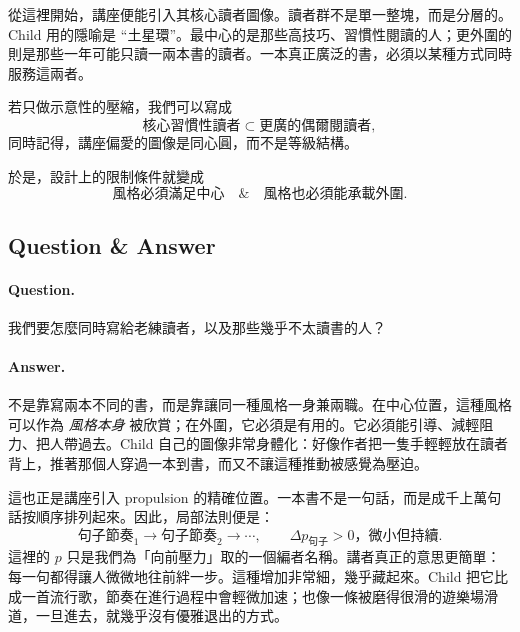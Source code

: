 從這裡開始，講座便能引入其核心讀者圖像。讀者群不是單一整塊，而是分層的。Child 用的隱喻是 ``土星環''。最中心的是那些高技巧、習慣性閱讀的人；更外圍的則是那些一年可能只讀一兩本書的讀者。一本真正廣泛的書，必須以某種方式同時服務這兩者。

若只做示意性的壓縮，我們可以寫成
\begin{equation}
\text{核心習慣性讀者} \subset \text{更廣的偶爾閱讀者},
\end{equation}
同時記得，講座偏愛的圖像是同心圓，而不是等級結構。

\begin{figure}[h]
\centering
{}
\end{figure}

於是，設計上的限制條件就變成
\begin{equation}
\text{風格必須滿足中心} \quad \& \quad \text{風格也必須能承載外圍}.
\end{equation}

\subsection{Question \& Answer}

\paragraph{Question.} 我們要怎麼同時寫給老練讀者，以及那些幾乎不太讀書的人？

\paragraph{Answer.} 不是靠寫兩本不同的書，而是靠讓同一種風格一身兼兩職。在中心位置，這種風格可以作為 \emph{風格本身} 被欣賞；在外圍，它必須是有用的。它必須能引導、減輕阻力、把人帶過去。Child 自己的圖像非常身體化：好像作者把一隻手輕輕放在讀者背上，推著那個人穿過一本到書，而又不讓這種推動被感覺為壓迫。

這也正是講座引入 propulsion 的精確位置。一本書不是一句話，而是成千上萬句話按順序排列起來。因此，局部法則便是：
\begin{equation}
\text{句子節奏}_1 \to \text{句子節奏}_2 \to \cdots,
\qquad
\Delta p_{\text{句子}} > 0 \text{，微小但持續}.
\end{equation}
這裡的 \(p\) 只是我們為「向前壓力」取的一個編者名稱。講者真正的意思更簡單：每一句都得讓人微微地往前絆一步。這種增加非常細，幾乎藏起來。Child 把它比成一首流行歌，節奏在進行過程中會輕微加速；也像一條被磨得很滑的遊樂場滑道，一旦進去，就幾乎沒有優雅退出的方式。

